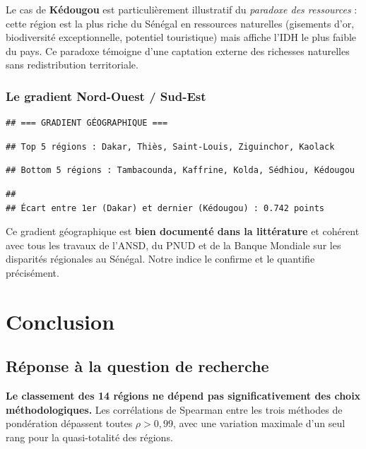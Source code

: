\documentclass[
]{article}
\begin{document}
Le cas de \textbf{Kédougou} est particulièrement illustratif du
\emph{paradoxe des ressources} : cette région est la plus riche du
Sénégal en ressources naturelles (gisements d'or, biodiversité
exceptionnelle, potentiel touristique) mais affiche l'IDH le plus faible
du pays. Ce paradoxe témoigne d'une captation externe des richesses
naturelles sans redistribution territoriale.

\subsubsection{Le gradient Nord-Ouest /
Sud-Est}\label{le-gradient-nord-ouest-sud-est}

\begin{verbatim}
## === GRADIENT GÉOGRAPHIQUE ===
\end{verbatim}

\begin{verbatim}
## Top 5 régions : Dakar, Thiès, Saint-Louis, Ziguinchor, Kaolack
\end{verbatim}

\begin{verbatim}
## Bottom 5 régions : Tambacounda, Kaffrine, Kolda, Sédhiou, Kédougou
\end{verbatim}

\begin{verbatim}
## 
## Écart entre 1er (Dakar) et dernier (Kédougou) : 0.742 points
\end{verbatim}

Ce gradient géographique est \textbf{bien documenté dans la littérature}
et cohérent avec tous les travaux de l'ANSD, du PNUD et de la Banque
Mondiale sur les disparités régionales au Sénégal. Notre indice le
confirme et le quantifie précisément.

\newpage

\section{Conclusion}\label{conclusion}

\subsection{Réponse à la question de
recherche}\label{ruxe9ponse-uxe0-la-question-de-recherche}

\textbf{Le classement des 14 régions ne dépend pas significativement des
choix méthodologiques.} Les corrélations de Spearman entre les trois
méthodes de pondération dépassent toutes \(\rho > 0{,}99\), avec une
variation maximale d'un seul rang pour la quasi-totalité des régions.
\end{document}
